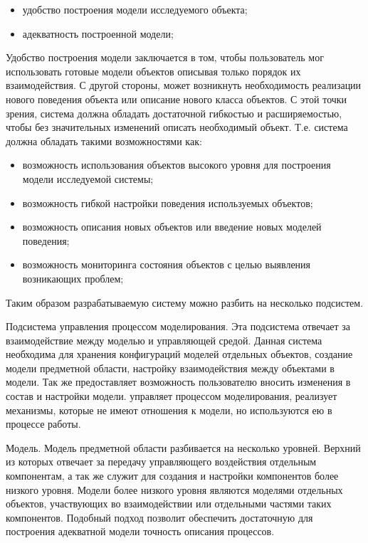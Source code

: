 \begin{itemize}
    \item удобство построения модели исследуемого объекта;
    \item адекватность построенной модели;
\end{itemize}

    Удобство построения модели заключается в том, чтобы пользователь мог использовать готовые модели объектов описывая только порядок их взаимодействия. С другой стороны, может возникнуть необходимость реализации нового поведения объекта или описание нового класса объектов. С этой точки зрения, система должна обладать достаточной гибкостью и расширяемостью, чтобы без значительных изменений описать необходимый объект. Т.е. система должна обладать такими возможностями как:

\begin{itemize}
    \item возможность использования объектов высокого уровня для построения модели исследуемой системы;
    \item возможность гибкой настройки поведения используемых объектов;
    \item возможность описания новых объектов или введение новых моделей поведения;
    \item возможность мониторинга состояния объектов с целью выявления возникающих проблем;
\end{itemize}

    Таким образом разрабатываемую систему можно разбить на несколько подсистем.

    Подсистема управления процессом моделирования. Эта подсистема отвечает за взаимодействие между моделью и управляющей средой. Данная система необходима для хранения конфигураций моделей отдельных объектов, создание модели предметной области, настройку взаимодействия между объектами в модели. Так же предоставляет возможность пользователю вносить изменения в состав и настройки модели. управляет процессом моделирования, реализует механизмы, которые не имеют отношения к модели, но используются ею в процессе работы.

    Модель. Модель предметной области разбивается на несколько уровней. Верхний из которых отвечает за передачу управляющего воздействия отдельным компонентам, а так же служит для создания и настройки компонентов более низкого уровня. Модели более низкого уровня являются моделями отдельных объектов, участвующих во взаимодействии или отдельными частями таких компонентов. Подобный подход позволит обеспечить достаточную для построения адекватной модели точность описания процессов.

